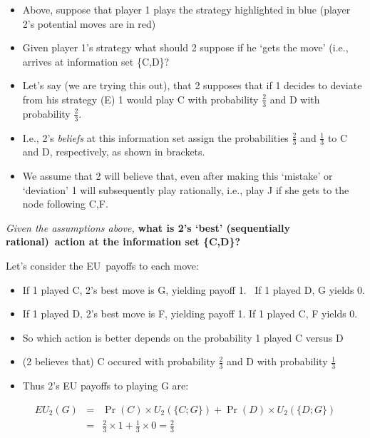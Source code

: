 \documentclass{article}
\begin{document}
\begin{itemize}
\item Above, suppose that player 1 plays the strategy highlighted in blue
(player 2's potential moves are in red)

\item Given player 1's strategy what should 2 suppose if he `gets the move'
(i.e., arrives at information set \{C,D\}?

\item Let's say (we are trying this out), that 2 supposes that if 1 decides
to deviate from his strategy (E) 1 would play C with probability $\frac{2}{3}
$ and D with probability $\frac{2}{3}$.

\item I.e., 2's \textit{beliefs} at this information set assign the
probabilities $\frac{2}{3}$ and $\frac{1}{3}$ to C and D, respectively, as
shown in brackets.

\item We assume that 2 will believe that, even after making this `mistake'
or `deviation' 1 will subsequently play rationally, i.e., play J if she gets
to the node following C,F.
\end{itemize}

\bigskip

\textit{Given the assumptions above, }\textbf{what is 2's `best'
(sequentially rational)\ action at the information set \{C,D\}?}

Let's consider the EU\ payoffs to each move:

\begin{itemize}
\item If 1 played C, 2's best move is G, yielding payoff 1. \ If 1 played D,
G yields 0.

\item If 1 played D, 2's best move is F, yielding payoff 1. If 1 played C, F
yields 0.

\item So which action is better depends on the probability 1 played C versus
D

\item (2 believes that) C occured with probability $\frac{2}{3}$ and D with
probability $\frac{1}{3}$

\item Thus 2's EU payoffs to playing G are:
\end{itemize}

\begin{eqnarray*}
EU_{2}(G) &=&\Pr (C)\times U_{2}(\{C;G\})+\Pr (D)\times U_{2}(\{D;G\}) \\
&=&\frac{2}{3}\times 1+\frac{1}{3}\times 0=\frac{2}{3}
\end{eqnarray*}
\end{document}

